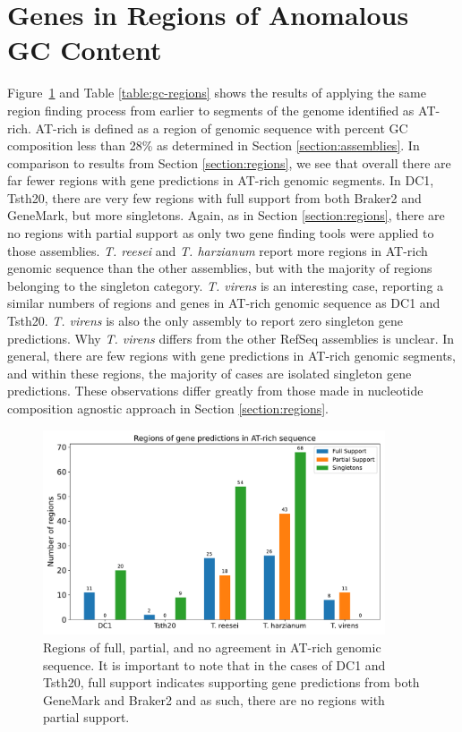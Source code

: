 \section{Genes in Regions of Anomalous GC Content}
\label{section:gc-regions}

Figure~\ref{fig:gc-regions} and Table \ref{table:gc-regions} shows the results of applying the same
region finding process from earlier to segments of the genome
identified as AT-rich. AT-rich is defined as a region of genomic
sequence with percent GC composition less than 28\% as determined in
Section \ref{section:assemblies}. In comparison to results from
Section \ref{section:regions}, we see that overall there are far fewer
regions with gene predictions in AT-rich genomic segments. In DC1,
Tsth20, there are very few regions with full support from both Braker2
and GeneMark, but more singletons. Again, as in Section
\ref{section:regions}, there are no regions with partial support as
only two gene finding tools were applied to those
assemblies. \textit{T. reesei} and \textit{T. harzianum} report more
regions in AT-rich genomic sequence than the other assemblies, but
with the majority of regions belonging to the singleton
category. \textit{T. virens} is an interesting case, reporting a
similar numbers of regions and genes in AT-rich genomic sequence as
DC1 and Tsth20. \textit{T. virens} is also the only assembly to report
zero singleton gene predictions. Why \textit{T. virens} differs from
the other RefSeq assemblies is unclear. In general, there are few
regions with gene predictions in AT-rich genomic segments, and within
these regions, the majority of cases are isolated singleton gene
predictions. These observations differ greatly from those made in
nucleotide composition agnostic approach in Section
\ref{section:regions}.

\begin{figure}
  \centering
  \includegraphics[width=0.90\textwidth]{figures/atrich-regions-barplot.pdf}
  \caption[Regions of agreement in AT-rich genomic sequence]{Regions of full, partial, and no agreement in AT-rich genomic sequence. It is important to note that in the cases of DC1 and Tsth20, full support indicates supporting gene predictions from both GeneMark and Braker2 and as such, there are no regions with partial support.}
  \label{fig:gc-regions}
\end{figure}

